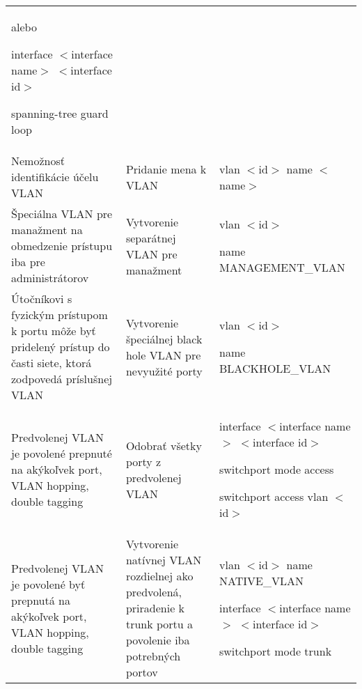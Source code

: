 \begin{longtable}[!htbp]{|L{10em}L{10em}>{\selectfont}L{34em}|}
	\vspace{0.5em}
	{\selectfont alebo }
	\vspace{0.5em}
	
	interface $<$interface name$>$ $<$interface id$>$
	
	\hspace{0.5em}spanning-tree guard loop\\
	
	
	
	
	Nemožnosť identifikácie účelu VLAN	&Pridanie mena k VLAN	&vlan $<$id$>$
	name $<$name$>$\\
	
	
	
	
	 Špeciálna VLAN pre manažment na obmedzenie prístupu iba pre administrátorov	&Vytvorenie separátnej VLAN pre manažment	&vlan $<$id$>$
	
	\hspace{0.5em}name MANAGEMENT\_VLAN\\
	
	
	
	
	Útočníkovi s fyzickým prístupom k portu môže byť pridelený prístup do časti siete, ktorá zodpovedá príslušnej VLAN 	&Vytvorenie špeciálnej black hole VLAN pre nevyužité porty	&vlan $<$id$>$ 
	
	\hspace{0.5em}name BLACKHOLE\_VLAN\\
	
	
	
	
	 Predvolenej VLAN je povolené prepnuté na akýkoľvek port, VLAN hopping, double tagging	&Odobrať všetky porty z predvolenej VLAN	&interface $<$interface name$>$ $<$interface id$>$
	
	\hspace{0.5em} switchport mode access
	
	\hspace{0.5em} switchport access vlan $<$id$>$\\
	
	
	
	
	Predvolenej VLAN je povolené byť prepnutá na akýkoľvek port, VLAN hopping, double tagging	&Vytvorenie natívnej VLAN rozdielnej ako predvolená, priradenie k trunk portu a povolenie iba potrebných portov	&vlan $<$id$>$  
	name NATIVE\_VLAN
	
	interface $<$interface name$>$ $<$interface id$>$
	
	\hspace{0.5em}switchport mode trunk
	

\end{longtable}

